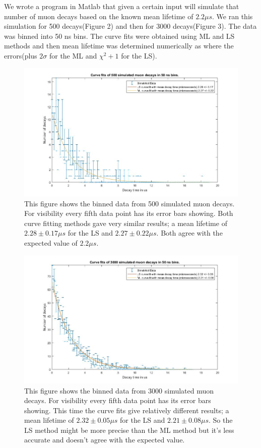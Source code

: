 \documentclass{article}
\begin{document}
We wrote a program in Matlab that given a certain input will simulate that number of muon decays based on the known mean lifetime of $2.2 \mu s$.  We ran this simulation for 500 decays(Figure 2) and then for 3000 decays(Figure 3).  The data was binned into 50 ns bins.  The curve fits were obtained using ML and LS methods and then mean lifetime was determined numerically as where the errors(plus $2\sigma$ for the ML and $\chi^2+1$ for the LS).  

\begin{figure}[H]
\includegraphics[scale=0.6,center]{Simulated_500.jpg}
\caption{This figure shows the binned data from 500 simulated muon decays.  For visibility every fifth data point has its error bars showing.  Both curve fitting methods gave very similar results; a mean lifetime of $2.28 \pm 0.17 \mu s$ for the LS and $2.27 \pm 0.22 \mu s$.  Both agree with the expected value of $2.2 \mu s$.}
\end{figure}

\begin{figure}[H]
\includegraphics[scale=0.6,center]{Simulated_3000.jpg}
\caption{This figure shows the binned data from 3000 simulated muon decays.  For visibility every fifth data point has its error bars showing.  This time the curve fits give relatively different results; a mean lifetime of $2.32 \pm 0.05 \mu s$ for the LS and $2.21 \pm 0.08 \mu s$.  So the LS method might be more precise than the ML method but it's less accurate and doesn't agree with the expected value.}
\end{figure}
\end{document}
